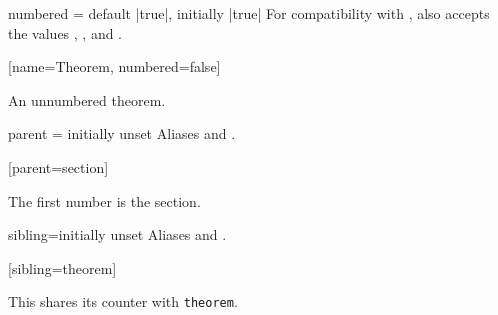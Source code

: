 \documentclass{ltxdoc}
\begin{document}
\begin{docKey}{numbered}
  {=\textbar{}\textbar {}}
  {default |true|, initially |true|}
For compatibility with , also accepts the values , , and .

\begin{codepreamble}
[name=Theorem, numbered=false]
\end{codepreamble}

\begin{keythmscode}[withpreamble]
\begin{theorem*}
An unnumbered theorem.
\end{theorem*}
\end{keythmscode}

\end{docKey}

\begin{docKey}{parent}
  {=}
  {initially unset}
Aliases  and .

\begin{codepreamble}
[parent=section]
\end{codepreamble}

\begin{keythmscode}[withpreamble]
\begin{conjecture}
The first number is the section.
\end{conjecture}
\end{keythmscode}

\end{docKey}

\begin{docKey}{sibling}{=}{initially unset}
Aliases  and .

\begin{codepreamble}
[sibling=theorem]
\end{codepreamble}

\begin{keythmscode}[withpreamble]
\begin{lemma}
This shares its counter with \texttt{theorem}.
\end{lemma}
\end{keythmscode}

\end{docKey}
\end{document}

